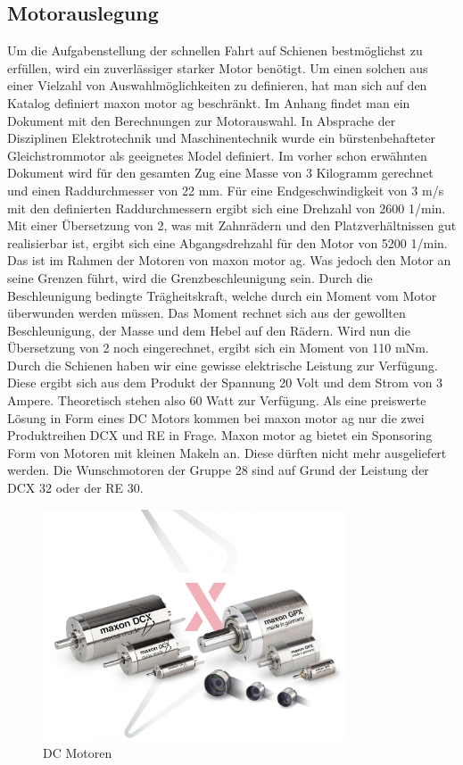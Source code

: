 \documentclass[../../main.tex]{subfiles}
\begin{document}
    \subsection{Motorauslegung}
          Um die Aufgabenstellung der schnellen Fahrt auf Schienen bestmöglichst zu erfüllen, wird ein zuverlässiger
          starker Motor benötigt. Um einen solchen aus einer Vielzahl von Auswahlmöglichkeiten zu definieren, hat man
          sich auf den Katalog definiert maxon motor ag beschränkt. Im Anhang findet man ein Dokument mit den
          Berechnungen zur Motorauswahl. In Absprache der Disziplinen Elektrotechnik und Maschinentechnik wurde ein
          bürstenbehafteter Gleichstrommotor als geeignetes Model definiert. Im vorher schon erwähnten Dokument wird für
          den gesamten Zug eine Masse von 3 Kilogramm gerechnet und einen Raddurchmesser von 22 mm. Für eine
          Endgeschwindigkeit von 3 m/s mit den definierten Raddurchmessern ergibt sich eine Drehzahl von 2600 1/min. Mit
          einer Übersetzung von 2, was mit Zahnrädern und den Platzverhältnissen gut realisierbar ist, ergibt sich eine
          Abgangsdrehzahl für den Motor von 5200 1/min. Das ist im Rahmen der Motoren von maxon motor ag. Was jedoch den
          Motor an seine Grenzen führt, wird die Grenzbeschleunigung sein. Durch die Beschleunigung bedingte
          Trägheitskraft, welche durch ein Moment vom Motor überwunden werden müssen. Das Moment rechnet sich aus der
          gewollten Beschleunigung, der Masse und dem Hebel auf den Rädern. Wird nun die Übersetzung von 2 noch
          eingerechnet, ergibt sich ein Moment von 110 mNm. Durch die Schienen haben wir eine gewisse elektrische
          Leistung zur Verfügung. Diese ergibt sich aus dem Produkt der Spannung 20 Volt und dem Strom von 3 Ampere.
          Theoretisch stehen also 60
          Watt zur Verfügung. Als eine preiswerte Lösung in Form eines DC Motors kommen bei
          maxon motor ag nur die zwei Produktreihen DCX und RE in Frage. Maxon motor ag bietet ein Sponsoring Form
          von Motoren mit kleinen Makeln an. Diese dürften nicht mehr ausgeliefert werden. Die Wunschmotoren der Gruppe 28
          sind auf Grund der Leistung der DCX 32 oder der RE 30.

    \begin{figure}[H]
        \centering
        \includegraphics[width=0.8\textwidth]{../../images/Kran/Motors.JPG}
        \caption {DC Motoren}
    \end{figure}


    
\end{document}
